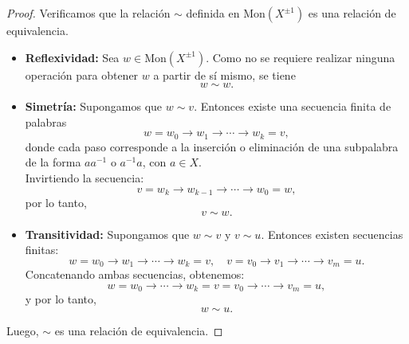 \begin{proposicion}
\end{proposicion}












\begin{proof}
	Verificamos que la relación \(\sim\) definida en \(\mathrm{Mon}(X^{\pm1})\) es una relación de equivalencia.
	
	\begin{itemize}
		\item \textbf{Reflexividad:} Sea \(w \in \mathrm{Mon}(X^{\pm1})\). Como no se requiere realizar ninguna operación para obtener \(w\) a partir de sí mismo, se tiene
		\[
		w \sim w.
		\]
		
		\item \textbf{Simetría:} Supongamos que \(w \sim v\). Entonces existe una secuencia finita de palabras
		\[
		w = w_0 \rightarrow w_1 \rightarrow \cdots \rightarrow w_k = v,
		\]
		donde cada paso corresponde a la inserción o eliminación de una subpalabra de la forma \(a a^{-1}\) o \(a^{-1} a\), con \(a \in X\).\\
		Invirtiendo la secuencia:
		\[
		v = w_k \rightarrow w_{k-1} \rightarrow \cdots \rightarrow w_0 = w,
		\]
		por lo tanto,
		\[
		v \sim w.
		\]
		
		\item \textbf{Transitividad:} Supongamos que \(w \sim v\) y \(v \sim u\). Entonces existen secuencias finitas:
		\[
		w = w_0 \rightarrow w_1 \rightarrow \cdots \rightarrow w_k = v, \quad
		v = v_0 \rightarrow v_1 \rightarrow \cdots \rightarrow v_m = u.
		\]
		Concatenando ambas secuencias, obtenemos:
		\[
		w = w_0 \rightarrow \cdots \rightarrow w_k = v = v_0 \rightarrow \cdots \rightarrow v_m = u,
		\]
		y por lo tanto,
		\[
		w \sim u.
		\]
	\end{itemize}
	
	Luego, \(\sim\) es una relación de equivalencia.
\end{proof}


\begin{observacion}
\end{observacion}





